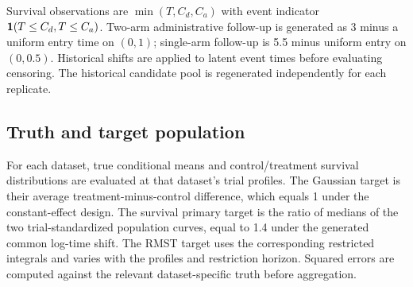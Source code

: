 Survival observations are $\min(T,C_d,C_a)$ with event indicator $\mathbf{1}(T\leq C_d,T\leq C_a)$. Two-arm administrative follow-up is generated as 3 minus a uniform entry time on $(0,1)$; single-arm follow-up is 5.5 minus uniform entry on $(0,0.5)$. Historical shifts are applied to latent event times before evaluating censoring. The historical candidate pool is regenerated independently for each replicate.

\subsection{Truth and target population}\label{sec:E.3}
For each dataset, true conditional means and control/treatment survival distributions are evaluated at that dataset's trial profiles. The Gaussian target is their average treatment-minus-control difference, which equals 1 under the constant-effect design. The survival primary target is the ratio of medians of the two trial-standardized population curves, equal to 1.4 under the generated common log-time shift. The RMST target uses the corresponding restricted integrals and varies with the profiles and restriction horizon. Squared errors are computed against the relevant dataset-specific truth before aggregation.

